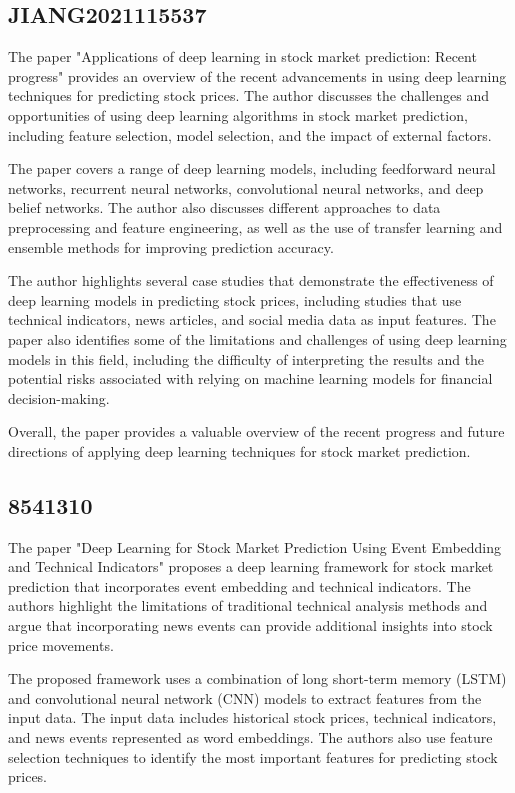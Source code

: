 \documentclass{article}
\begin{document}
\subsection{JIANG2021115537}
The paper "Applications of deep learning in stock market prediction: Recent progress" provides an overview of the recent advancements in using deep learning techniques for predicting stock prices. The author discusses the challenges and opportunities of using deep learning algorithms in stock market prediction, including feature selection, model selection, and the impact of external factors.

The paper covers a range of deep learning models, including feedforward neural networks, recurrent neural networks, convolutional neural networks, and deep belief networks. The author also discusses different approaches to data preprocessing and feature engineering, as well as the use of transfer learning and ensemble methods for improving prediction accuracy.

The author highlights several case studies that demonstrate the effectiveness of deep learning models in predicting stock prices, including studies that use technical indicators, news articles, and social media data as input features. The paper also identifies some of the limitations and challenges of using deep learning models in this field, including the difficulty of interpreting the results and the potential risks associated with relying on machine learning models for financial decision-making.

Overall, the paper provides a valuable overview of the recent progress and future directions of applying deep learning techniques for stock market prediction.


\subsection{8541310}
The paper "Deep Learning for Stock Market Prediction Using Event Embedding and Technical Indicators" proposes a deep learning framework for stock market prediction that incorporates event embedding and technical indicators. The authors highlight the limitations of traditional technical analysis methods and argue that incorporating news events can provide additional insights into stock price movements.

The proposed framework uses a combination of long short-term memory (LSTM) and convolutional neural network (CNN) models to extract features from the input data. The input data includes historical stock prices, technical indicators, and news events represented as word embeddings. The authors also use feature selection techniques to identify the most important features for predicting stock prices.
\end{document}
